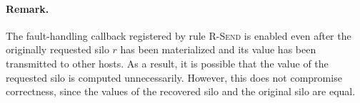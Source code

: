 \paragraph{Remark.} The fault-handling callback registered by rule \textsc{R-Send} is enabled
even after the originally requested silo $r$ has been materialized and
its value has been transmitted to other hosts. As a result, it is
possible that the value of the requested silo is computed
unnecessarily. However, this does not compromise correctness, since
the values of the recovered silo and the original silo are equal.



%
